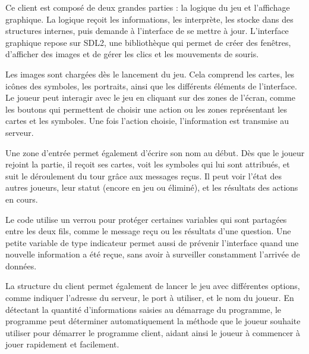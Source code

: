 \documentclass{article}
\begin{document}
Ce client est composé de deux grandes parties : la logique du jeu et l'affichage graphique. La logique reçoit les informations, les interprète, les stocke dans des structures internes, puis demande à l'interface de se mettre à jour. L'interface graphique repose sur SDL2, une bibliothèque qui permet de créer des fenêtres, d'afficher des images et de gérer les clics et les mouvements de souris.

Les images sont chargées dès le lancement du jeu. Cela comprend les cartes, les icônes des symboles, les portraits, ainsi que les différents éléments de l'interface. Le joueur peut interagir avec le jeu en cliquant sur des zones de l'écran, comme les boutons qui permettent de choisir une action ou les zones représentant les cartes et les symboles. Une fois l'action choisie, l'information est transmise au serveur.

Une zone d'entrée permet également d'écrire son nom au début. Dès que le joueur rejoint la partie, il reçoit ses cartes, voit les symboles qui lui sont attribués, et suit le déroulement du tour grâce aux messages reçus. Il peut voir l'état des autres joueurs, leur statut (encore en jeu ou éliminé), et les résultats des actions en cours.

Le code utilise un verrou pour protéger certaines variables qui sont partagées entre les deux fils, comme le message reçu ou les résultats d'une question. Une petite variable de type indicateur permet aussi de prévenir l'interface quand une nouvelle information a été reçue, sans avoir à surveiller constamment l'arrivée de données.

La structure du client permet également de lancer le jeu avec différentes options, comme indiquer l'adresse du serveur, le port à utiliser, et le nom du joueur. En détectant la quantité d'informations saisies au démarrage du programme, le programme peut déterminer automatiquement la méthode que le joueur souhaite utiliser pour démarrer le programme client, aidant ainsi le joueur à commencer à jouer rapidement et facilement.
\end{document}
